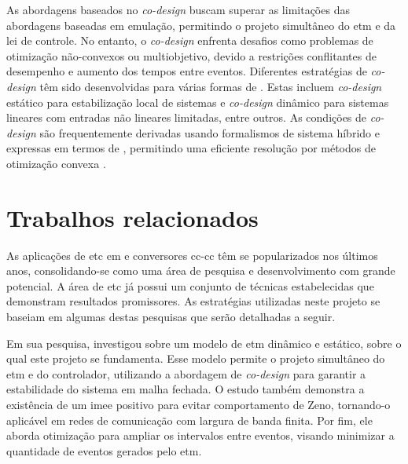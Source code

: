 As abordagens baseados no \textit{co-design} buscam superar as limitações das abordagens baseadas em emulação, permitindo o projeto simultâneo do \acrshort{etm} e da lei de controle. No entanto, o \textit{co-design} enfrenta desafios como problemas de otimização não-convexos ou multiobjetivo, devido a restrições conflitantes de desempenho e aumento dos tempos entre eventos. Diferentes estratégias de \textit{co-design} têm sido desenvolvidas para várias formas de . Estas incluem \textit{co-design} estático para estabilização local de sistemas  e \textit{co-design} dinâmico para sistemas lineares com entradas não lineares limitadas, entre outros. As condições de \textit{co-design} são frequentemente derivadas usando formalismos de sistema híbrido e expressas em termos de , permitindo uma eficiente resolução por métodos de otimização convexa \citep{coutinho2021}.

\section{Trabalhos relacionados}

As aplicações de \acrshort{etc} em  e conversores \acrshort{cc}-\acrshort{cc} têm se popularizados nos últimos anos, consolidando-se como uma área de pesquisa e desenvolvimento com grande potencial. A área de \acrshort{etc} já possui um conjunto de técnicas estabelecidas que demonstram resultados promissores. As estratégias utilizadas neste projeto se baseiam em algumas destas pesquisas que serão detalhadas a seguir.

Em sua pesquisa, \cite{coutinho2021} investigou sobre um modelo de \acrshort{etm} dinâmico e estático, sobre o qual este projeto se fundamenta. Esse modelo permite o projeto simultâneo do \acrshort{etm} e do controlador, utilizando a abordagem de \textit{co-design} para garantir a estabilidade do sistema em malha fechada. O estudo também demonstra a existência de um \acrfull{imee} positivo para evitar comportamento de Zeno, tornando-o aplicável em redes de comunicação com largura de banda finita. Por fim, ele aborda otimização para ampliar os intervalos entre eventos, visando minimizar a quantidade de eventos gerados pelo \acrshort{etm}. 

